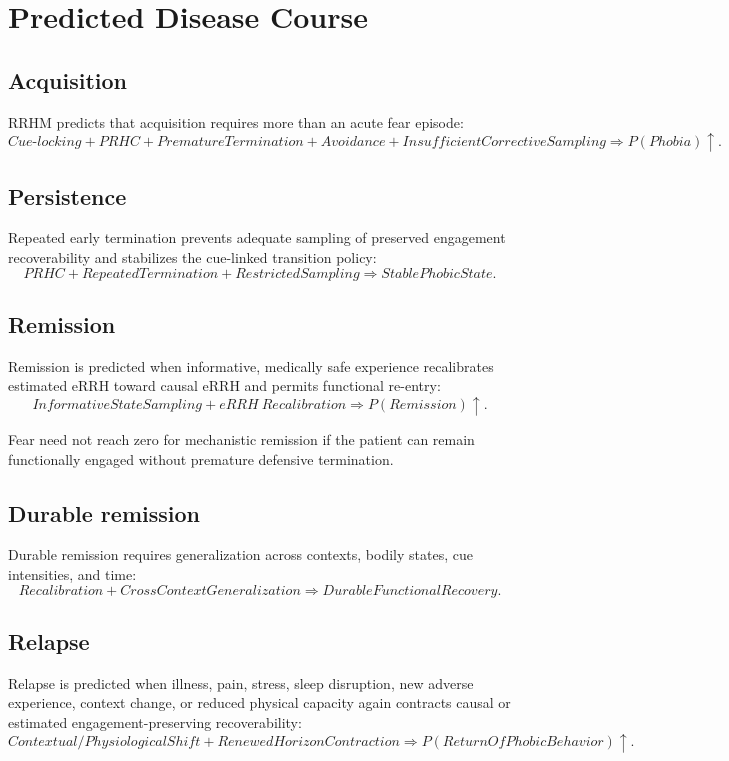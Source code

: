 \documentclass[9pt,twocolumn]{article}
\begin{document}
\section{Predicted Disease Course}
\subsection{Acquisition}
RRHM predicts that acquisition requires more than an acute fear episode:
\[
Cue\text{-}locking + PRHC + PrematureTermination + Avoidance + InsufficientCorrectiveSampling
\Rightarrow P(Phobia)\uparrow.
\]

\subsection{Persistence}
Repeated early termination prevents adequate sampling of preserved engagement recoverability and stabilizes the cue-linked transition policy:
\[
PRHC + RepeatedTermination + RestrictedSampling
\Rightarrow StablePhobicState.
\]

\subsection{Remission}
Remission is predicted when informative, medically safe experience recalibrates estimated eRRH toward causal eRRH and permits functional re-entry:
\[
InformativeStateSampling + eRRH\ Recalibration
\Rightarrow P(Remission)\uparrow.
\]

Fear need not reach zero for mechanistic remission if the patient can remain functionally engaged without premature defensive termination.

\subsection{Durable remission}
Durable remission requires generalization across contexts, bodily states, cue intensities, and time:
\[
Recalibration + CrossContextGeneralization
\Rightarrow DurableFunctionalRecovery.
\]

\subsection{Relapse}
Relapse is predicted when illness, pain, stress, sleep disruption, new adverse experience, context change, or reduced physical capacity again contracts causal or estimated engagement-preserving recoverability:
\[
Contextual/PhysiologicalShift + RenewedHorizonContraction
\Rightarrow P(ReturnOfPhobicBehavior)\uparrow.
\]
\end{document}

